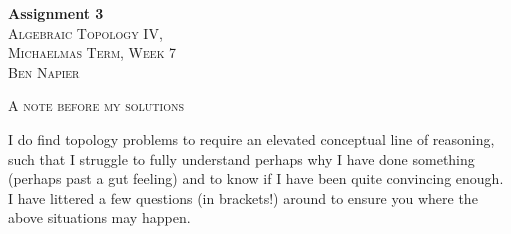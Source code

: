 



\begin{center}
  \textbf{Assignment 3} \\
  \textsc{Algebraic Topology IV, \\ Michaelmas Term, Week 7} \\
  \textsc{Ben Napier}
  \vspace{1em}
\end{center}


\begin{center}
  \small
  \parbox{0.5\textwidth}{
    \begin{center}
      \textsc{A note before my solutions}
    \end{center}
    \vspace{0.5em}
    I do find topology problems to require an elevated conceptual line of reasoning, such that I struggle to fully understand perhaps why I have done something (perhaps past a gut feeling) and to know if I have been quite convincing enough. I have littered a few questions (in brackets!) around to ensure you where the above situations may happen. 
  }
  \vspace{0.5em}
\end{center}

